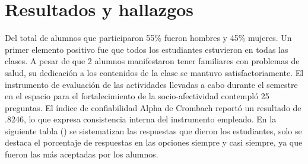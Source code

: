\documentclass[spanish]{textolivre}
\begin{document}
\section{Resultados y hallazgos}
Del total de alumnos que participaron 55\% fueron hombres y 45\% mujeres. Un primer elemento positivo fue que todos los estudiantes estuvieron en todas las clases. A pesar de que 2 alumnos manifestaron tener familiares con problemas de salud, su dedicación a los contenidos de la clase se mantuvo satisfactoriamente. El instrumento de evaluación de las actividades llevadas a cabo durante el semestre en el espacio para el fortalecimiento de la socio-afectividad contempló 25 preguntas. El índice de confiabilidad Alpha de Crombach reportó un resultado de .8246, lo que expresa consistencia interna del instrumento empleado. En la siguiente tabla () se sistematizan las respuestas que dieron los estudiantes, solo se destaca el porcentaje de respuestas en las opciones siempre y casi siempre, ya que fueron las más aceptadas por los alumnos.
\end{document}
